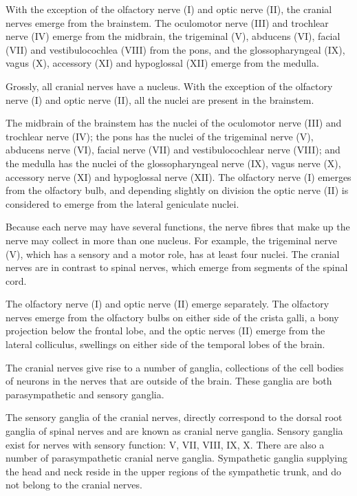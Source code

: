 With the exception of the olfactory nerve (I) and optic nerve (II), the cranial nerves emerge from the brainstem. The oculomotor nerve (III) and trochlear nerve (IV) emerge from the midbrain, the trigeminal (V), abducens (VI), facial (VII) and vestibulocochlea (VIII) from the pons, and the glossopharyngeal (IX), vagus (X), accessory (XI) and hypoglossal (XII) emerge from the medulla.

Grossly, all cranial nerves have a nucleus. With the exception of the olfactory nerve (I) and optic nerve (II), all the nuclei are present in the brainstem.

The midbrain of the brainstem has the nuclei of the oculomotor nerve (III) and trochlear nerve (IV); the pons has the nuclei of the trigeminal nerve (V), abducens nerve (VI), facial nerve (VII) and vestibulocochlear nerve (VIII); and the medulla has the nuclei of the glossopharyngeal nerve (IX), vagus nerve (X), accessory nerve (XI) and hypoglossal nerve (XII). The olfactory nerve (I) emerges from the olfactory bulb, and depending slightly on division the optic nerve (II) is considered to emerge from the lateral geniculate nuclei.

Because each nerve may have several functions, the nerve fibres that make up the nerve may collect in more than one nucleus. For example, the trigeminal nerve (V), which has a sensory and a motor role, has at least four nuclei.
The cranial nerves are in contrast to spinal nerves, which emerge from segments of the spinal cord.

The olfactory nerve (I) and optic nerve (II) emerge separately. The olfactory nerves emerge from the olfactory bulbs on either side of the crista galli, a bony projection below the frontal lobe, and the optic nerves (II) emerge from the lateral colliculus, swellings on either side of the temporal lobes of the brain.

The cranial nerves give rise to a number of ganglia, collections of the cell bodies of neurons in the nerves that are outside of the brain. These ganglia are both parasympathetic and sensory ganglia.

The sensory ganglia of the cranial nerves, directly correspond to the dorsal root ganglia of spinal nerves and are known as cranial nerve ganglia. Sensory ganglia exist for nerves with sensory function: V, VII, VIII, IX, X. There are also a number of parasympathetic cranial nerve ganglia. Sympathetic ganglia supplying the head and neck reside in the upper regions of the sympathetic trunk, and do not belong to the cranial nerves.

